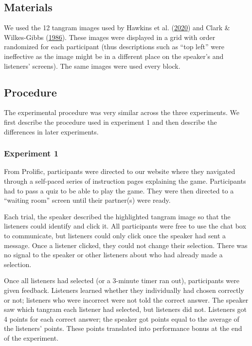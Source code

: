 \documentclass[
  english,
  a4paper,
]{article}
\begin{document}
\hypertarget{materials}{%
\subsection{Materials}\label{materials}}

We used the 12 tangram images used by Hawkins et al. (\protect\hyperlink{ref-hawkins2020}{2020}) and Clark \& Wilkes-Gibbs (\protect\hyperlink{ref-clark1986}{1986}). These images were displayed in a grid with order randomized for each participant (thus descriptions such as ``top left'' were ineffective as the image might be in a different place on the speaker's and listeners' screens). The same images were used every block.

\hypertarget{procedure}{%
\subsection{Procedure}\label{procedure}}

The experimental procedure was very similar across the three experiments. We first describe the procedure used in experiment 1 and then describe the differences in later experiments.

\hypertarget{experiment-1}{%
\subsubsection{Experiment 1}\label{experiment-1}}

From Prolific, participants were directed to our website where they navigated through a self-paced series of instruction pages explaining the game. Participants had to pass a quiz to be able to play the game. They were then directed to a ``waiting room'' screen until their partner(s) were ready.

Each trial, the speaker described the highlighted tangram image so that the listeners could identify and click it. All participants were free to use the chat box to communicate, but listeners could only click once the speaker had sent a message. Once a listener clicked, they could not change their selection. There was no signal to the speaker or other listeners about who had already made a selection.

Once all listeners had selected (or a 3-minute timer ran out), participants were given feedback. Listeners learned whether they individually had chosen correctly or not; listeners who were incorrect were not told the correct answer. The speaker saw which tangram each listener had selected, but listeners did not. Listeners got 4 points for each correct answer; the speaker got points equal to the average of the listeners' points. These points translated into performance bonus at the end of the experiment.
\end{document}
